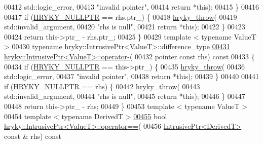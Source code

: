 \begin{DoxyCode}
00412             std::logic\_error,
00413             \textcolor{stringliteral}{"invalid pointer"},
00414             \textcolor{keywordflow}{return} *\textcolor{keyword}{this});
00415     \}
00416 
00417     \textcolor{keywordflow}{if} (\hyperlink{common_8h_a4cd4ac09cfcdbd6b30ee69afc156e210}{HRYKY_NULLPTR} == rhs.ptr\_) \{
00418         \hyperlink{debug__common_8h_af50606eac4009921527ddcaed392b2c2}{hryky_throw}(
00419             std::invalid\_argument,
00420             \textcolor{stringliteral}{"rhs is null"},
00421             \textcolor{keywordflow}{return} *\textcolor{keyword}{this});
00422     \}
00423 
00424     \textcolor{keywordflow}{return} this->ptr\_ - rhs.ptr\_;
00425 \}
00429 \textcolor{keyword}{template} < \textcolor{keyword}{typename} ValueT >
00430 \textcolor{keyword}{typename} hryky::IntrusivePtr<ValueT>::difference\_type 
\hypertarget{intrusive__ptr_8h_source_l00431}{}\hyperlink{classhryky_1_1_intrusive_ptr_a3b15bb043f8480d4aa98d757ec5f66fa}{00431} \hyperlink{classhryky_1_1_intrusive_ptr}{hryky::IntrusivePtr<ValueT>::operator-}(
00432     pointer \textcolor{keyword}{const} rhs)\textcolor{keyword}{ const}
00433 \textcolor{keyword}{}\{
00434     \textcolor{keywordflow}{if} (\hyperlink{common_8h_a4cd4ac09cfcdbd6b30ee69afc156e210}{HRYKY_NULLPTR} == this->ptr\_) \{
00435         \hyperlink{debug__common_8h_af50606eac4009921527ddcaed392b2c2}{hryky_throw}(
00436             std::logic\_error,
00437             \textcolor{stringliteral}{"invalid pointer"},
00438             \textcolor{keywordflow}{return} *\textcolor{keyword}{this});
00439     \}
00440 
00441     \textcolor{keywordflow}{if} (\hyperlink{common_8h_a4cd4ac09cfcdbd6b30ee69afc156e210}{HRYKY_NULLPTR} == rhs) \{
00442         \hyperlink{debug__common_8h_af50606eac4009921527ddcaed392b2c2}{hryky_throw}(
00443             std::invalid\_argument,
00444             \textcolor{stringliteral}{"rhs is null"},
00445             \textcolor{keywordflow}{return} *\textcolor{keyword}{this});
00446     \}
00447 
00448     \textcolor{keywordflow}{return} this->ptr\_ - rhs;
00449 \}
00453 \textcolor{keyword}{template} < \textcolor{keyword}{typename} ValueT >
00454 \textcolor{keyword}{template} < \textcolor{keyword}{typename} DerivedT >
\hypertarget{intrusive__ptr_8h_source_l00455}{}\hyperlink{classhryky_1_1_intrusive_ptr_a9dde6dfd712df0d745d88494ab14354a}{00455} \textcolor{keywordtype}{bool} \hyperlink{namespacehryky_a96bfe0df0a09db56e7253330de4f2243}{hryky::IntrusivePtr<ValueT>::operator==}(
00456     \hyperlink{classhryky_1_1_intrusive_ptr}{IntrusivePtr<DerivedT>} \textcolor{keyword}{const} & rhs)\textcolor{keyword}{ const}

\end{DoxyCode}
